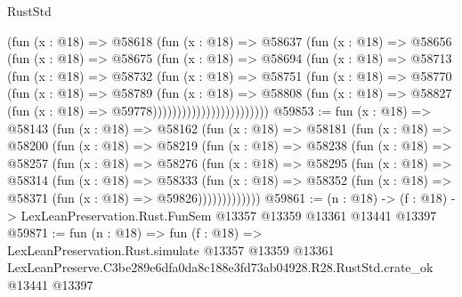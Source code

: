 \begin{lexlean}{RustStd}
\begin{coremodule}
                          (fun (x : @18) =>
                          @58618
                            (fun (x : @18) =>
                            @58637
                              (fun (x : @18) =>
                              @58656
                                (fun (x : @18) =>
                                @58675
                                  (fun (x : @18) =>
                                  @58694
                                    (fun (x : @18) =>
                                    @58713
                                      (fun (x : @18) =>
                                      @58732
                                        (fun (x : @18) =>
                                        @58751
                                          (fun (x : @18) =>
                                          @58770
                                            (fun (x : @18) =>
                                            @58789
                                              (fun (x : @18) =>
                                              @58808
                                                (fun (x : @18) =>
                                                @58827
                                                  (fun (x : @18) => @59778))))))))))))))))))))))))
@59853 := fun (x : @18) =>
  @58143
    (fun (x : @18) =>
    @58162
      (fun (x : @18) =>
      @58181
        (fun (x : @18) =>
        @58200
          (fun (x : @18) =>
          @58219
            (fun (x : @18) =>
            @58238
              (fun (x : @18) =>
              @58257
                (fun (x : @18) =>
                @58276
                  (fun (x : @18) =>
                  @58295
                    (fun (x : @18) =>
                    @58314
                      (fun (x : @18) =>
                      @58333
                        (fun (x : @18) =>
                        @58352 (fun (x : @18) => @58371 (fun (x : @18) => @59826)))))))))))))
@59861 := (n : @18) ->
  (f : @18) -> LexLeanPreservation.Rust.FunSem @13357 @13359 @13361 @13441 @13397
@59871 := fun (n : @18) =>
  fun (f : @18) =>
  LexLeanPreservation.Rust.simulate
    @13357
    @13359
    @13361
    LexLeanPreserve.C3be289e6dfa0da8c188e3fd73ab04928.R28.RustStd.crate_ok
    @13441
    @13397
\end{coremodule}
\end{lexlean}
